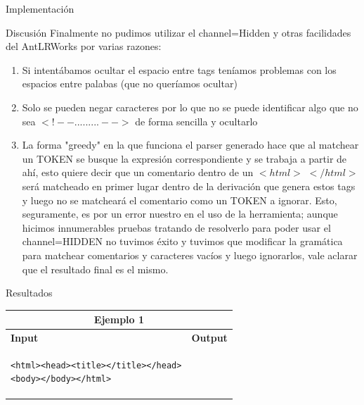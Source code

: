 \documentclass[a4paper,8pt]{article}
\begin{document}
\begin{section}{Implementación}
\begin{subsection}{Discusión}
Finalmente no pudimos utilizar el channel=Hidden y otras facilidades del AntLRWorks por varias razones:
\begin{enumerate}
 \item Si intentábamos ocultar el espacio entre tags teníamos problemas con los espacios entre palabas (que no queríamos ocultar)
\item Solo se pueden negar caracteres por lo que no se puede identificar algo que no sea $<!-- ......... -->$  de forma sencilla y ocultarlo
\item La forma "greedy" en la que funciona el parser generado hace que al matchear un TOKEN se busque la expresión correspondiente y se trabaja a partir de ahí, esto quiere decir que un comentario dentro de un $<html>$ $</html>$ será matcheado en primer lugar dentro de la derivación que genera estos tags y luego no se matcheará el comentario como un TOKEN a ignorar. Esto, seguramente, es por un error nuestro en el uso de la herramienta; aunque hicimos innumerables pruebas tratando de resolverlo para poder usar el channel=HIDDEN no tuvimos éxito y tuvimos que modificar la gramática para matchear comentarios y caracteres vacíos y luego ignorarlos, vale aclarar que el resultado final es el mismo.

\end{enumerate}


\end{subsection}
\newpage
\begin{subsection}{Resultados}
\begin{tabular}{|p{6.5cm}|p{6.5cm}|}
\hline 
\multicolumn{2}{|c|}{Ejemplo 1}\\
\hline 
\textbf{Input}&\textbf{Output}\\
\hline 
 \footnotesize{\begin{verbatim}<html><head><title></title></head>
<body></body></html>\end{verbatim}}


\end{tabular}
\end{subsection}
\end{section}
\end{document}
